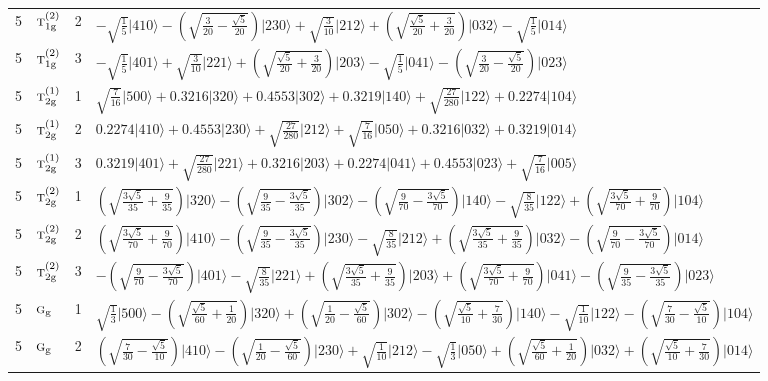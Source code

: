 \documentclass[11pt]{article}
\newcommand{\irr}[1]{\text{\normalfont\scshape #1}}
\newcommand{\ptag}[1]{\mathrm{#1}}
\newcommand{\occ}[1]{\lvert #1\rangle}
\begin{document}
\begin{longtable}{c l c p{}}
5 & $\irr{t}_{1\ptag{g}}^{(2)}$ & 2 & $-\sqrt{\tfrac{1}{5}}\occ{410}-(\sqrt{\frac{3}{20} - \frac{\sqrt{5}}{20}})\occ{230}+\sqrt{\tfrac{3}{10}}\occ{212}+(\sqrt{\frac{\sqrt{5}}{20} + \frac{3}{20}})\occ{032}-\sqrt{\tfrac{1}{5}}\occ{014}$\\
5 & $\irr{t}_{1\ptag{g}}^{(2)}$ & 3 & $-\sqrt{\tfrac{1}{5}}\occ{401}+\sqrt{\tfrac{3}{10}}\occ{221}+(\sqrt{\frac{\sqrt{5}}{20} + \frac{3}{20}})\occ{203}-\sqrt{\tfrac{1}{5}}\occ{041}-(\sqrt{\frac{3}{20} - \frac{\sqrt{5}}{20}})\occ{023}$\\
5 & $\irr{t}_{2\ptag{g}}^{(1)}$ & 1 & $\sqrt{\tfrac{7}{16}}\occ{500}+0.3216\occ{320}+0.4553\occ{302}+0.3219\occ{140}+\sqrt{\tfrac{27}{280}}\occ{122}+0.2274\occ{104}$\\
5 & $\irr{t}_{2\ptag{g}}^{(1)}$ & 2 & $0.2274\occ{410}+0.4553\occ{230}+\sqrt{\tfrac{27}{280}}\occ{212}+\sqrt{\tfrac{7}{16}}\occ{050}+0.3216\occ{032}+0.3219\occ{014}$\\
5 & $\irr{t}_{2\ptag{g}}^{(1)}$ & 3 & $0.3219\occ{401}+\sqrt{\tfrac{27}{280}}\occ{221}+0.3216\occ{203}+0.2274\occ{041}+0.4553\occ{023}+\sqrt{\tfrac{7}{16}}\occ{005}$\\
5 & $\irr{t}_{2\ptag{g}}^{(2)}$ & 1 & $(\sqrt{\frac{3 \sqrt{5}}{35} + \frac{9}{35}})\occ{320}-(\sqrt{\frac{9}{35} - \frac{3 \sqrt{5}}{35}})\occ{302}-(\sqrt{\frac{9}{70} - \frac{3 \sqrt{5}}{70}})\occ{140}-\sqrt{\tfrac{8}{35}}\occ{122}+(\sqrt{\frac{3 \sqrt{5}}{70} + \frac{9}{70}})\occ{104}$\\
5 & $\irr{t}_{2\ptag{g}}^{(2)}$ & 2 & $(\sqrt{\frac{3 \sqrt{5}}{70} + \frac{9}{70}})\occ{410}-(\sqrt{\frac{9}{35} - \frac{3 \sqrt{5}}{35}})\occ{230}-\sqrt{\tfrac{8}{35}}\occ{212}+(\sqrt{\frac{3 \sqrt{5}}{35} + \frac{9}{35}})\occ{032}-(\sqrt{\frac{9}{70} - \frac{3 \sqrt{5}}{70}})\occ{014}$\\
5 & $\irr{t}_{2\ptag{g}}^{(2)}$ & 3 & $-(\sqrt{\frac{9}{70} - \frac{3 \sqrt{5}}{70}})\occ{401}-\sqrt{\tfrac{8}{35}}\occ{221}+(\sqrt{\frac{3 \sqrt{5}}{35} + \frac{9}{35}})\occ{203}+(\sqrt{\frac{3 \sqrt{5}}{70} + \frac{9}{70}})\occ{041}-(\sqrt{\frac{9}{35} - \frac{3 \sqrt{5}}{35}})\occ{023}$\\
5 & $\irr{g}_{\ptag{g}}$ & 1 & $\sqrt{\tfrac{1}{3}}\occ{500}-(\sqrt{\frac{\sqrt{5}}{60} + \frac{1}{20}})\occ{320}+(\sqrt{\frac{1}{20} - \frac{\sqrt{5}}{60}})\occ{302}-(\sqrt{\frac{\sqrt{5}}{10} + \frac{7}{30}})\occ{140}-\sqrt{\tfrac{1}{10}}\occ{122}-(\sqrt{\frac{7}{30} - \frac{\sqrt{5}}{10}})\occ{104}$\\
5 & $\irr{g}_{\ptag{g}}$ & 2 & $(\sqrt{\frac{7}{30} - \frac{\sqrt{5}}{10}})\occ{410}-(\sqrt{\frac{1}{20} - \frac{\sqrt{5}}{60}})\occ{230}+\sqrt{\tfrac{1}{10}}\occ{212}-\sqrt{\tfrac{1}{3}}\occ{050}+(\sqrt{\frac{\sqrt{5}}{60} + \frac{1}{20}})\occ{032}+(\sqrt{\frac{\sqrt{5}}{10} + \frac{7}{30}})\occ{014}$\\

\end{longtable}
\end{document}

